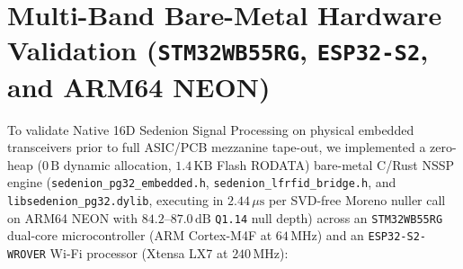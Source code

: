 \documentclass[journal,twoside]{IEEEtran}
\theoremstyle{definition}
\theoremstyle{remark}
\begin{document}
\section{Multi-Band Bare-Metal Hardware Validation (\texttt{STM32WB55RG}, \texttt{ESP32-S2}, and ARM64 NEON)}
\label{sec:baremetal_hw}
To validate Native 16D Sedenion Signal Processing on physical embedded transceivers prior to full ASIC/PCB mezzanine tape-out, we implemented a zero-heap ($0\,\mathrm{B}$ dynamic allocation, $1.4\,\mathrm{KB}$ Flash RODATA) bare-metal C/Rust NSSP engine (\texttt{sedenion\_pg32\_embedded.h}, \texttt{sedenion\_lfrfid\_bridge.h}, and \texttt{libsedenion\_pg32.dylib}, executing in $2.44\,\mu\mathrm{s}$ per SVD-free Moreno nuller call on ARM64 NEON with $84.2\text{--}87.0\,\mathrm{dB}$ \texttt{Q1.14} null depth) across an \texttt{STM32WB55RG} dual-core microcontroller (ARM Cortex-M4F at $64\,\mathrm{MHz}$) and an \texttt{ESP32-S2-WROVER} Wi-Fi processor (Xtensa LX7 at $240\,\mathrm{MHz}$):
\end{document}
